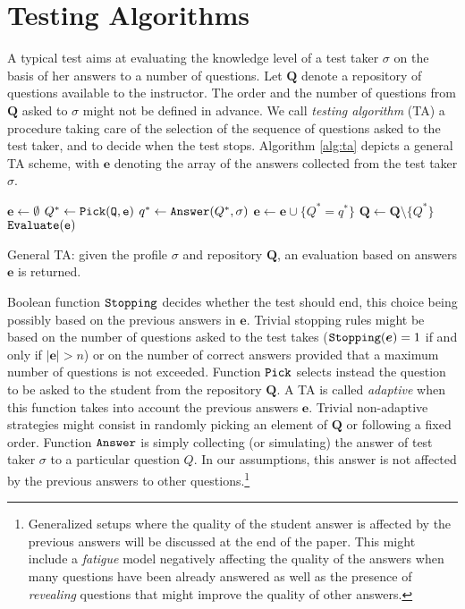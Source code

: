 \documentclass[runningheads]{llncs}
\begin{document}
\section{Testing Algorithms}\label{sec:cat}
A typical test aims at evaluating the knowledge level of a test taker $\sigma$ on the basis of her answers to a number of questions. Let $\bm{Q}$ denote a repository of questions available to the instructor. The order and the number of questions from $\bm{Q}$ asked to $\sigma$ might not be defined in advance. We call \emph{testing algorithm} (TA) a procedure taking care of the selection of the sequence of questions asked to the test taker, and to decide when the test stops. Algorithm \ref{alg:ta} depicts a general TA scheme, with $\bm{e}$ denoting the array of the answers collected from the test taker $\sigma$.

\begin{algorithm}[htp!]
\begin{algorithmic}[1]
\STATE $\bm{e}\gets\emptyset$
\STATE $Q^* \gets \tt{Pick}(\bm{Q},\bm{e})$
\STATE $q^* \gets {\tt{Answer}}(Q^*,\sigma)$
\STATE $\bm{e} \gets \bm{e} \cup \{ Q^*=q^* \}$
\STATE $\bm{Q} \gets \bm{Q} \setminus \{ Q^*\}$
\ENDWHILE
{} $\tt{Evaluate}(\bm{e})$
\end{algorithmic}
\caption{General TA: given the profile $\sigma$ and repository $\bm{Q}$, an evaluation based on answers $\bm{e}$ is returned.\label{alg:ta}}
\end{algorithm}

Boolean function ${\tt Stopping}$ decides whether the test should end, this choice being possibly based on the previous answers in $\bm{e}$. Trivial stopping rules might be based on the number of questions asked to the test takes (${\tt Stopping}(\bm{e})=1$ if and only if $|\bm{e}|>n$) or on the number of correct answers provided that a maximum number of questions is not exceeded. Function ${\tt Pick}$ selects instead the question to be asked to the student from the repository $\bm{Q}$. A TA is called \emph{adaptive} when this function takes into account the previous answers $\bm{e}$. Trivial non-adaptive strategies might consist in randomly picking an element of $\bm{Q}$ or following a fixed order. Function ${\tt Answer}$ is simply collecting (or simulating) the answer of test taker $\sigma$ to a particular question $Q$. In our assumptions, this answer is not affected by the previous answers to other questions.\footnote{Generalized setups where the quality of the student answer is affected by the previous answers will be discussed at the end of the paper. This might include a \emph{fatigue} model negatively affecting the quality of the answers when many questions have been already answered as well as the presence of \emph{revealing} questions that might improve the quality of other answers.} 
\end{document}
